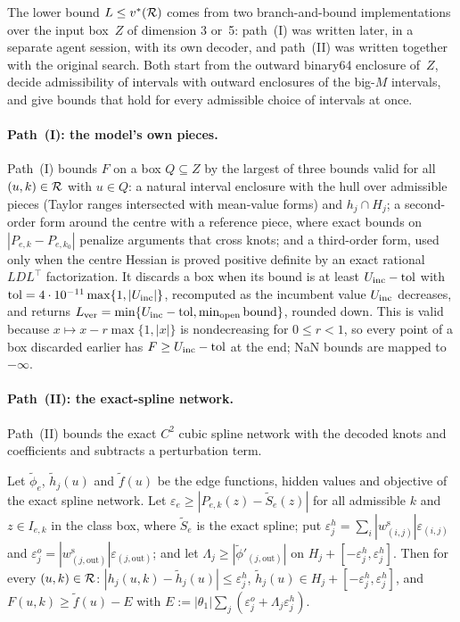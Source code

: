 The lower bound $L\le v^{*}(\mathcal{R})$ comes from two branch-and-bound implementations over the input box~$Z$ of dimension 3 or~5: path~(I) was written later, in a separate agent session, with its own decoder, and path~(II) was written together with the original search.
Both start from the outward binary64 enclosure of~$Z$, decide admissibility of intervals with outward enclosures of the big-$M$ intervals, and give bounds that hold for every admissible choice of intervals at once.

\paragraph{Path~(I): the model's own pieces.}
Path~(I) bounds $F$ on a box $Q\subseteq Z$ by the largest of three bounds valid for all $(u,k)\in\mathcal{R}$ with $u\in Q$: a natural interval enclosure with the hull over admissible pieces (Taylor ranges intersected with mean-value forms) and $h_j\cap H_j$; a second-order form around the centre with a reference piece, where exact bounds on $|P_{e,k}-P_{e,k_0}|$ penalize arguments that cross knots; and a third-order form, used only when the centre Hessian is proved positive definite by an exact rational $LDL^{\top}$ factorization.
It discards a box when its bound is at least $U_{\mathrm{inc}}-\mathrm{tol}$ with $\mathrm{tol}=4\cdot10^{-11}\max\{1,|U_{\mathrm{inc}}|\}$, recomputed as the incumbent value $U_{\mathrm{inc}}$ decreases, and returns $L_{\mathrm{ver}}=\min\{U_{\mathrm{inc}}-\mathrm{tol},\min_{\text{open}}\text{bound}\}$, rounded down.
This is valid because $x\mapsto x-r\max\{1,|x|\}$ is nondecreasing for $0\le r<1$, so every point of a box discarded earlier has $F\ge U_{\mathrm{inc}}-\mathrm{tol}$ at the end; NaN bounds are mapped to $-\infty$.

\paragraph{Path~(II): the exact-spline network.}
Path~(II) bounds the exact $C^2$ cubic spline network with the decoded knots and coefficients and subtracts a perturbation term.

\begin{lemma}[perturbation]\label{lem:kan-perturbation}
Let $\tilde\phi_e$, $\tilde h_j(u)$ and $\tilde f(u)$ be the edge functions, hidden values and objective of the exact spline network.
Let $\varepsilon_e\ge|P_{e,k}(z)-\tilde S_e(z)|$ for all admissible $k$ and $z\in I_{e,k}$ in the class box, where $\tilde S_e$ is the exact spline; put $\varepsilon^h_j=\sum_i|w^{\mathrm s}_{(i,j)}|\varepsilon_{(i,j)}$ and $\varepsilon^o_j=|w^{\mathrm s}_{(j,\mathrm{out})}|\varepsilon_{(j,\mathrm{out})}$; and let $\Lambda_j\ge|\tilde\phi'_{(j,\mathrm{out})}|$ on $H_j+[-\varepsilon^h_j,\varepsilon^h_j]$.
Then for every $(u,k)\in\mathcal{R}$: $|h_j(u,k)-\tilde h_j(u)|\le\varepsilon^h_j$, $\tilde h_j(u)\in H_j+[-\varepsilon^h_j,\varepsilon^h_j]$, and $F(u,k)\ge\tilde f(u)-E$ with $E:=|\theta_1|\sum_j(\varepsilon^o_j+\Lambda_j\varepsilon^h_j)$.
\end{lemma}

